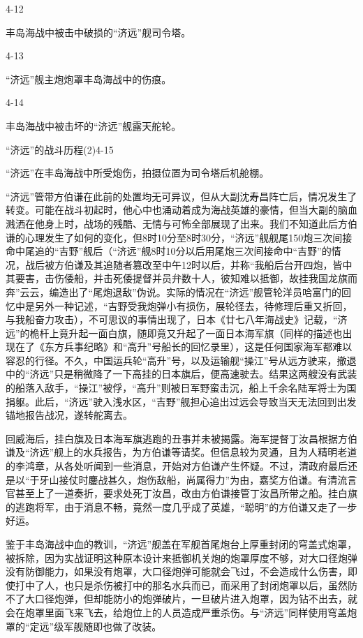 \documentclass[12pt,UTF8]{ctexbook}
\begin{document}
4-12

丰岛海战中被击中破损的“济远”舰司令塔。

4-13

“济远”舰主炮炮罩丰岛海战中的伤痕。

4-14

丰岛海战中被击坏的“济远”舰露天舵轮。

“济远”的战斗历程(2)4-15

“济远”在丰岛海战中所受炮伤，拍摄位置为司令塔后机舱棚。

“济远”管带方伯谦在此前的处置均无可异议，但从大副沈寿昌阵亡后，情况发生了转变。可能在战斗初起时，他心中也涌动着成为海战英雄的豪情，但当大副的脑血溅洒在他身上时，战场的残酷、无情与可怖全部展现了出来。我们不知道此后方伯谦的心理发生了如何的变化，但8时10分至8时30分，“济远”舰舰尾150炮三次间接命中尾追的“吉野”舰后（“济远”舰8时10分以后用尾炮三次间接命中“吉野”的情况，战后被方伯谦及其追随者篡改至中午12时以后，并称“我船后台开四炮，皆中其要害，击伤倭船，并击死倭提督并员弁数十人，彼知难以抵御，故挂我国龙旗而奔”云云，编造出了“尾炮退敌”伪说。实际的情况在“济远”舰管轮洋员哈富门的回忆中是另外一种记述，“吉野受我炮弹小有损伤，展轮径去，待修理后重又折回，与我船奋力攻击），不可思议的事情出现了，日本《廿七八年海战史》记载，“济远”的桅杆上竟升起一面白旗，随即竟又升起了一面日本海军旗（同样的描述也出现在了《东方兵事纪略》和“高升”号船长的回忆录里），这是任何国家海军都难以容忍的行径。不久，中国运兵轮“高升”号，以及运输舰“操江”号从远方驶来，撤退中的“济远”只是稍微降了一下高挂的日本旗后，便高速驶去。结果这两艘没有武装的船落入敌手，“操江”被俘，“高升”则被日军野蛮击沉，船上千余名陆军将士为国捐躯。此后，“济远”驶入浅水区，“吉野”舰担心追出过远会导致当天无法回到出发锚地报告战况，遂转舵离去。

回威海后，挂白旗及日本海军旗逃跑的丑事并未被揭露。海军提督丁汝昌根据方伯谦及“济远”舰上的水兵报告，为方伯谦等请奖。但信息较为灵通，且为人精明老道的李鸿章，从各处听闻到一些消息，开始对方伯谦产生怀疑。不过，清政府最后还是以“于牙山接仗时鏖战甚久，炮伤敌船，尚属得力”为由，嘉奖方伯谦。有清流言官甚至上了一道奏折，要求处死丁汝昌，改由方伯谦接管丁汝昌所带之船。挂白旗的逃跑将军，由于消息不畅，竟然一度几乎成了英雄，“聪明”的方伯谦又走了一步好运。

鉴于丰岛海战中血的教训，“济远”舰盖在军舰首尾炮台上厚重封闭的穹盖式炮罩，被拆除，因为实战证明这种原本设计来抵御机关炮的炮罩厚度不够，对大口径炮弹没有防御能力，如果没有炮罩，大口径炮弹可能就会飞过，不会造成什么伤害，即使打中了人，也只是杀伤被打中的那名水兵而已，而采用了封闭炮罩以后，虽然防不了大口径炮弹，但却能防小的炮弹破片，一旦破片进入炮罩，因为钻不出去，就会在炮罩里面飞来飞去，给炮位上的人员造成严重杀伤。与“济远”同样使用穹盖炮罩的“定远”级军舰随即也做了改装。
\end{document}
